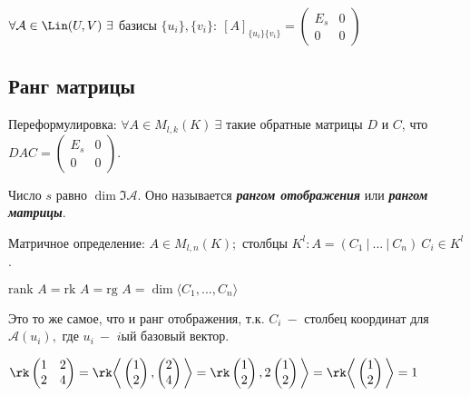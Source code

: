 \begin{theorem}
    $\forall \mathcal{A}\in \Lin (U,V)\ \exists $ базисы 
$\{u_i\},\{v_i\}:\ [A]_{\{u_i\}\{v_i\}}=\left(\begin{array}{c|c}E_s & 
0\\\hline 0 & 0\end{array}\right)$ 
\end{theorem}

\subsection{Ранг матрицы}
\begin{definition}
    Переформулировка: $\forall A\in M_{l,k}(K)\ \exists$ такие обратные 
матрицы $D$ и $C$, что $DAC=\left(\begin{array}{c|c}E_s & 0\\\hline 0 & 
0\end{array}\right)$.

    Число $s$ равно $\dim\Im \mathcal{A}$. Оно называется 
\textbf{\textit{рангом отображения}} или \textbf{\textit{рангом матрицы}}.
\end{definition}


\begin{definition}
    Матричное определение: $A\in M_{l,n}(K);$ столбцы $K^l:A=(C_1\ |\ ...\ 
|\ C_n)\ C_i\in K^l$.

    $\text{rank } A=\text{rk } A=\text{rg } A = \dim \langle 
C_1,...,C_n\rangle$
\end{definition}

\begin{remark}
    Это то же самое, что и ранг отображения, т.к. $C_i\ -$ столбец 
координат для $\mathcal{A}(u_i),$ где $u_i\ -$ $i$ый базовый вектор.
\end{remark}

\begin{example}
    $\rk \begin{pmatrix}
        1 & 2 \\
        2 & 4
    \end{pmatrix}= \rk \bigg\langle \begin{pmatrix}
        1  \\
        2
    \end{pmatrix}, \begin{pmatrix}
        2  \\
        4
    \end{pmatrix}\bigg\rangle = \rk \begin{pmatrix}
        1  \\
        2
    \end{pmatrix}, 2 \begin{pmatrix}
        1  \\
        2
    \end{pmatrix}\bigg\rangle = \rk \bigg\langle \begin{pmatrix}
        1  \\
        2
    \end{pmatrix} \bigg\rangle = 1$
\end{example}

